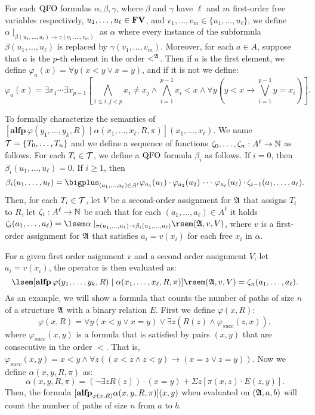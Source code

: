 For each ${\rm QFO}$ formulas $\alpha, \beta, \gamma$, where $\beta$ and $\gamma$ have $\ell$ and $m$ first-order free variables respectively, $u_1,\ldots,u_{\ell} \in \mathbf{FV}$, and $v_1,\ldots,v_m \in \{u_1,\ldots,u_{\ell}\}$, we define $\alpha\mid_{\beta(u_1,\ldots,u_{\ell})\to\gamma(v_1,\ldots,v_{m})}$ as $\alpha$ where every instance of the subformula $\beta(u_1,\ldots,u_{\ell})$ is replaced by $\gamma(v_1,\ldots,v_{m})$. Moreover, for each $a\in A$, suppose that $a$ is the $p$-th element in the order $<^{\mathfrak{A}}$. Then if $a$ is the first element, we define $\varphi_a(x) = \forall y(x < y \vee x = y)$, and if it is not we define:
$$
\varphi_a(x) = \exists x_1 \cdots \exists x_{p-1}[\bigwedge_{1\leq i,j < p}x_i\neq x_j \wedge \bigwedge_{i = 1}^{p-1} x_i < x \wedge \forall y(y < x \to \bigvee_{i = 1}^{p-1} y = x_i)].
$$

To formally characterize the semantics of $[\textbf{alfp}\,\varphi(y_1,\ldots,y_k,R)\mid\alpha(x_1,\ldots,x_{\ell},R,\pi)](x_1,\ldots,x_{\ell})$. %
We name $\mathcal{T} = \{T_0,\ldots,T_n\}$ and we define a sequence of functions $\zeta_0,\ldots,\zeta_n:A^{\ell}\to\mathbb{N}$ as follows. For each $T_i \in \mathcal{T}$, we define a ${\rm QFO}$ formula $\beta_i$ as follows. If $i = 0$, then $\beta_i(u_1,\ldots,u_{\ell}) = 0$. If $i \geq 1$, then
$$
\beta_i(u_1,\ldots,u_{\ell}) = \bigplus_{(a_1,\ldots,a_{\ell})\in A^{\ell}} \varphi_{a_1}(u_1)\cdot\varphi_{a_2}(u_2)\,\cdots\,\varphi_{a_{\ell}}(u_{\ell})\cdot \zeta_{i-1}(a_1,\ldots,a_{\ell}).
$$
Then, for each $T_i \in \mathcal{T}$, let $V$ be a second-order assignment for $\mathfrak{A}$ that assigns $T_i$ to $R$, let $\zeta_i: A^{\ell}\to\mathbb{N}$ be such that for each $(a_1,\ldots,a_{\ell})\in A^{\ell}$ it holds $\zeta_i(a_1,\ldots,a_{\ell}) = \sem{\alpha\mid_{\pi(u_1,\ldots,u_{\ell})\to \beta_i(u_1,\ldots,u_{\ell})}}(\A,v,V)$, where $v$ is a first-order assignment for $\mathfrak{A}$ that satisfies $a_i = v(x_i)$ for each free $x_i$ in $\alpha$.

For a given first order asignment $v$ and a second order assignment $V$, let $a_i = v(x_i)$, the operator is then evaluated as:
$$
\sem{[\textbf{alfp}\,\varphi(y_1,\ldots,y_k,R)\mid\alpha(x_1,\ldots,x_{\ell},R,\pi)]}(\A,v,V) = \zeta_n(a_1,\ldots,a_{\ell}).
$$
As an example, we will show a formula that counts the number of paths of size $n$ of a structure $\mathfrak{A}$ with a binary relation $E$. First we define $\varphi(x,R)$:
$$
\varphi(x,R) = \forall y(x < y \vee x = y) \vee \exists z(R(z) \wedge \varphi_{succ}(z,x)),
$$
where $\varphi_{succ}(x,y)$ is a formula that is satisfied by pairs $(x,y)$ that are consecutive in the order $<$. That is, $\varphi_{succ}(x,y) = x < y \wedge \forall z((x < z \wedge z < y) \to (x = z \vee z = y) )$. Now we define $\alpha(x,y,R,\pi)$ as:
$$
\alpha(x,y,R,\pi) = (\neg \exists zR(z))\cdot(x = y) + \Sigma z[\pi(x,z)\cdot E(z,y)].
$$
Then, the formula $[{\bf alfp}_{\varphi(x,R)} \alpha(x,y,R,\pi)](x,y)$ when evaluated on $(\mathfrak{A},a,b)$ will count the number of paths of size $n$ from $a$ to $b$.

